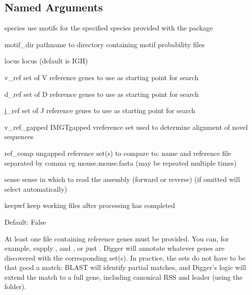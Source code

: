 \documentclass[letterpaper,10pt,english]{sphinxmanual}
\begin{document}
\subsection{Named Arguments}
\label{\detokenize{tools/digger:named-arguments}}\begin{optionlist}{3cm}
\item [\sphinxhyphen{}species]  
\sphinxAtStartPar
use motifs for the specified species provided with the package
\item [\sphinxhyphen{}motif\_dir]  
\sphinxAtStartPar
pathname to directory containing motif probability files
\item [\sphinxhyphen{}locus]  
\sphinxAtStartPar
locus (default is IGH)
\item [\sphinxhyphen{}v\_ref]  
\sphinxAtStartPar
set of V reference genes to use as starting point for search
\item [\sphinxhyphen{}d\_ref]  
\sphinxAtStartPar
set of D reference genes to use as starting point for search
\item [\sphinxhyphen{}j\_ref]  
\sphinxAtStartPar
set of J reference genes to use as starting point for search
\item [\sphinxhyphen{}v\_ref\_gapped]  
\sphinxAtStartPar
IMGT\sphinxhyphen{}gapped v\sphinxhyphen{}reference set used to determine alignment of novel sequences
\item [\sphinxhyphen{}ref\_comp]  
\sphinxAtStartPar
ungapped reference set(s) to compare to: name and reference file separated by comma eg mouse,mouse.fasta (may be repeated multiple times)
\item [\sphinxhyphen{}sense]  
\sphinxAtStartPar
sense in which to read the assembly (forward or reverse) (if omitted will select automatically)
\item [\sphinxhyphen{}keepwf]  
\sphinxAtStartPar
keep working files after processing has completed

\sphinxAtStartPar
Default: False
\end{optionlist}

\sphinxAtStartPar
At least one file containing reference genes must be provided. You can, for example, supply ,  and , or just . Digger will annotate whatever genes are discovered with the corresponding set(s).
In practice, the sets do not have to be that good a match: BLAST will identify partial matches, and Digger’s logic will extend the match to a full gene, including canonical RSS and leader (using the  folder).
\end{document}

